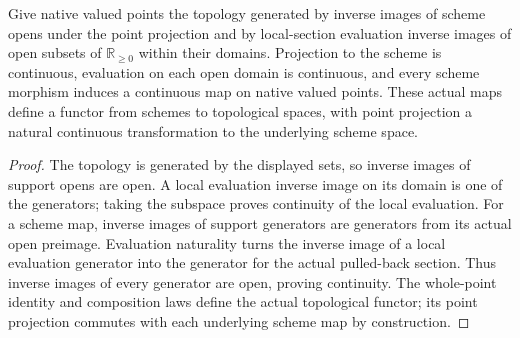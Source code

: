 \begin{theorem}
\label{scheme:valued-point-topology}
\leanok
{}
Give native valued points the topology generated by inverse images of scheme
opens under the point projection and by local-section evaluation inverse images
of open subsets of $\mathbb R_{\ge0}$ within their domains. Projection to the
scheme is continuous, evaluation on each open domain is continuous, and every
scheme morphism induces a continuous map on native valued points. These
actual maps define a functor from schemes to topological spaces, with point
projection a natural continuous transformation to the underlying scheme space.
\end{theorem}
\begin{proof}
The topology is generated by the displayed sets, so inverse images of support
opens are open. A local evaluation inverse image on its domain is one of the
generators; taking the subspace proves continuity of the local evaluation.
For a scheme map, inverse images of support generators are generators from its
actual open preimage. Evaluation naturality turns the inverse image of a local
evaluation generator into the generator for the actual pulled-back section.
Thus inverse images of every generator are open, proving continuity. The
whole-point identity and composition laws define the actual topological functor;
its point projection commutes with each underlying scheme map by construction.
\end{proof}

